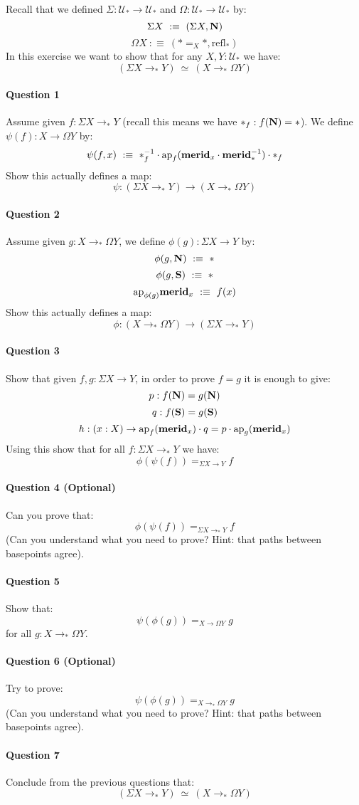 \documentclass{article}[6pt]%
\newcommand{\U}{{\mathcal U}}
\renewcommand{\r}{\rightarrow}
\newcommand{\ap}{\mathrm{ap}}
\newcommand{\refl}{\mathrm{refl}}
\newcommand{\N}{\mathrm{\bf N}}
\renewcommand{\S}{\mathrm{\bf S}}
\newcommand{\merid}{\mathrm{\bf merid}}
\begin{document}
\begin{Exercise}[title={Loop and suspension}]
Recall that we defined $\Sigma : \U_* \r \U_*$ and $\Omega:\U_*\r\U_*$ by:
\[\Sigma X \ :\equiv\ (\Sigma X,\N)\]
\[\Omega X\ :\equiv\ (*=_X*,\refl_*)\]
In this exercise we want to show that for any $X,Y:\U_*$ we have:
\[(\Sigma X \r_* Y)\ \simeq\ (X\r_*\Omega Y)\]

\paragraph{Question 1} Assume given $f:\Sigma X\r_* Y$ (recall this means we have $*_f:f(\N)=*$). We define $\psi(f) : X\r \Omega Y$ by:
\[\psi(f,x) \ :\equiv\ *_f^{-1} \cdot \ap_f(\merid_x\cdot\merid_*^{-1})\cdot *_f\]
Show this actually defines a map:
\[\psi : (\Sigma X \r_* Y) \r (X\r_*\Omega Y)\]

\paragraph{Question 2} Assume given $g:X\r_*\Omega Y$, we define $\phi(g) : \Sigma X \r Y$ by:
\[\phi(g,\N) \ :\equiv\ *\]
\[\phi(g,\S) \ :\equiv\ *\]
\[\ap_{\phi(g)}\merid_x \ :\equiv\ f(x)\]
Show this actually defines a map:
\[\phi :  (X\r_*\Omega Y) \r (\Sigma X \r_* Y)\]

\paragraph{Question 3} Show that given $f,g:\Sigma X \r Y$, in order to prove $f=g$ it is enough to give:
\[p:f(\N)=g(\N)\]
\[q:f(\S)=g(\S)\]
\[h : (x:X) \r \ap_f(\merid_x) \cdot q = p\cdot \ap_g(\merid_x)\]
Using this show that for all $f:\Sigma X \r_* Y$ we have: 
\[\phi(\psi(f)) =_{\Sigma X \r Y} f\]

\paragraph{Question 4 (Optional)} Can you prove that:
\[\phi(\psi(f)) =_{\Sigma X \r_* Y} f\]
(Can you understand what you need to prove? Hint: that paths between basepoints agree).

\paragraph{Question 5} Show that: 
\[\psi(\phi(g)) =_{X\r\Omega Y} g\] 
for all $g:X\r_*\Omega Y$.

\paragraph{Question 6 (Optional)} Try to prove:
\[\psi(\phi(g)) =_{X\r_*\Omega Y} g\]
(Can you understand what you need to prove? Hint: that paths between basepoints agree).

\paragraph{Question 7} Conclude from the previous questions that:
\[(\Sigma X \r_* Y)\ \simeq\ (X\r_*\Omega Y)\]

\end{Exercise}
\end{document}
